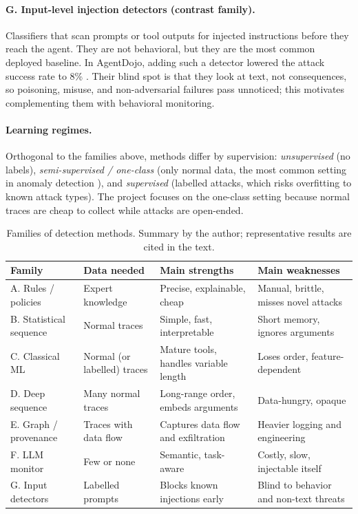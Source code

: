 \documentclass[11pt,a4paper]{article}
\begin{document}
\paragraph{G. Input-level injection detectors (contrast family).} Classifiers that scan prompts or tool outputs for injected instructions before they reach the agent. They are not behavioral, but they are the most common deployed baseline. In AgentDojo, adding such a detector lowered the attack success rate to 8\% \citep{debenedetti2024agentdojo}. Their blind spot is that they look at text, not consequences, so poisoning, misuse, and non-adversarial failures pass unnoticed; this motivates complementing them with behavioral monitoring.

\paragraph{Learning regimes.} Orthogonal to the families above, methods differ by supervision: \emph{unsupervised} (no labels), \emph{semi-supervised / one-class} (only normal data, the most common setting in anomaly detection \citep{chandola2009anomaly}), and \emph{supervised} (labelled attacks, which risks overfitting to known attack types). The project focuses on the one-class setting because normal traces are cheap to collect while attacks are open-ended.

\begin{table}[t]
\centering
\small
\begin{tabularx}{\linewidth}{L{2.7cm}L{2.4cm}YY}
\toprule
\textbf{Family} & \textbf{Data needed} & \textbf{Main strengths} & \textbf{Main weaknesses} \\
\midrule
A. Rules / policies & Expert knowledge & Precise, explainable, cheap & Manual, brittle, misses novel attacks \\
B. Statistical sequence & Normal traces & Simple, fast, interpretable & Short memory, ignores arguments \\
C. Classical ML & Normal (or labelled) traces & Mature tools, handles variable length & Loses order, feature-dependent \\
D. Deep sequence & Many normal traces & Long-range order, embeds arguments & Data-hungry, opaque \\
E. Graph / provenance & Traces with data flow & Captures data flow and exfiltration & Heavier logging and engineering \\
F. LLM monitor & Few or none & Semantic, task-aware & Costly, slow, injectable itself \\
G. Input detectors & Labelled prompts & Blocks known injections early & Blind to behavior and non-text threats \\
\bottomrule
\end{tabularx}
\caption{Families of detection methods. Summary by the author; representative results are cited in the text.}
\label{tab:methods}
\end{table}
\end{document}
